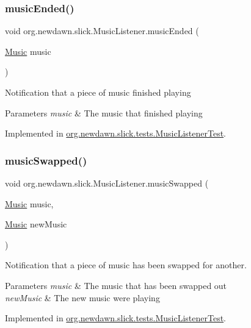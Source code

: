 \subsubsection{\texorpdfstring{music\+Ended()}{musicEnded()}}
{\footnotesize\ttfamily void org.\+newdawn.\+slick.\+Music\+Listener.\+music\+Ended (\begin{DoxyParamCaption}\item[{\mbox{\hyperlink{classorg_1_1newdawn_1_1slick_1_1_music}{Music}}}]{music }\end{DoxyParamCaption})}

Notification that a piece of music finished playing


\begin{DoxyParams}{Parameters}
{\em music} & The music that finished playing \\
\hline
\end{DoxyParams}


Implemented in \mbox{\hyperlink{classorg_1_1newdawn_1_1slick_1_1tests_1_1_music_listener_test_aba42fdf23841e22f89ef620b1b30fed1}{org.\+newdawn.\+slick.\+tests.\+Music\+Listener\+Test}}.

\mbox{\label{interfaceorg_1_1newdawn_1_1slick_1_1_music_listener_a29d640b90aae8c8de8a9bfe903eff2e3}} 
\subsubsection{\texorpdfstring{music\+Swapped()}{musicSwapped()}}
{\footnotesize\ttfamily void org.\+newdawn.\+slick.\+Music\+Listener.\+music\+Swapped (\begin{DoxyParamCaption}\item[{\mbox{\hyperlink{classorg_1_1newdawn_1_1slick_1_1_music}{Music}}}]{music,  }\item[{\mbox{\hyperlink{classorg_1_1newdawn_1_1slick_1_1_music}{Music}}}]{new\+Music }\end{DoxyParamCaption})}

Notification that a piece of music has been swapped for another.


\begin{DoxyParams}{Parameters}
{\em music} & The music that has been swapped out \\
\hline
{\em new\+Music} & The new music we\textquotesingle{}re playing \\
\hline
\end{DoxyParams}


Implemented in \mbox{\hyperlink{classorg_1_1newdawn_1_1slick_1_1tests_1_1_music_listener_test_afec2f67261476d841473bf75637cc595}{org.\+newdawn.\+slick.\+tests.\+Music\+Listener\+Test}}.

